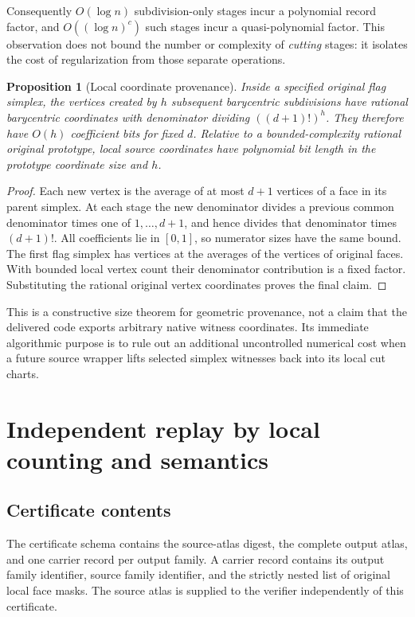 \documentclass[11pt]{article}
\newtheorem{proposition}[theorem]{Proposition}
\theoremstyle{definition}\newtheorem{definition}[theorem]{Definition}
\theoremstyle{remark}\newtheorem{remark}[theorem]{Remark}
\newcommand{\code}[1]{\texttt{\detokenize{#1}}}
\begin{document}
Consequently \(O(\log n)\) subdivision-only stages incur a polynomial record factor, and \(O((\log n)^c)\) such stages incur a quasi-polynomial factor. This observation does not bound the number or complexity of \emph{cutting} stages: it isolates the cost of regularization from those separate operations.

\begin{proposition}[Local coordinate provenance]\label{prop:coordinates}
Inside a specified original flag simplex, the vertices created by \(h\) subsequent barycentric subdivisions have rational barycentric coordinates with denominator dividing \(((d+1)!)^h\). They therefore have \(O(h)\) coefficient bits for fixed \(d\). Relative to a bounded-complexity rational original prototype, local source coordinates have polynomial bit length in the prototype coordinate size and \(h\).
\end{proposition}
\begin{proof}
Each new vertex is the average of at most \(d+1\) vertices of a face in its parent simplex. At each stage the new denominator divides a previous common denominator times one of \(1,\ldots,d+1\), and hence divides that denominator times \((d+1)!\). All coefficients lie in \([0,1]\), so numerator sizes have the same bound. The first flag simplex has vertices at the averages of the vertices of original faces. With bounded local vertex count their denominator contribution is a fixed factor. Substituting the rational original vertex coordinates proves the final claim.
\end{proof}

This is a constructive size theorem for geometric provenance, not a claim that the delivered code exports arbitrary native witness coordinates. Its immediate algorithmic purpose is to rule out an additional uncontrolled numerical cost when a future source wrapper lifts selected simplex witnesses back into its local cut charts.

\section{Independent replay by local counting and semantics}
\label{sec:replay}

\subsection{Certificate contents}
The certificate schema \code{affine-flag-regularization-v1} contains the source-atlas digest, the complete output atlas, and one carrier record per output family. A carrier record contains its output family identifier, source family identifier, and the strictly nested list of original local face masks. The source atlas is supplied to the verifier independently of this certificate.
\end{document}
